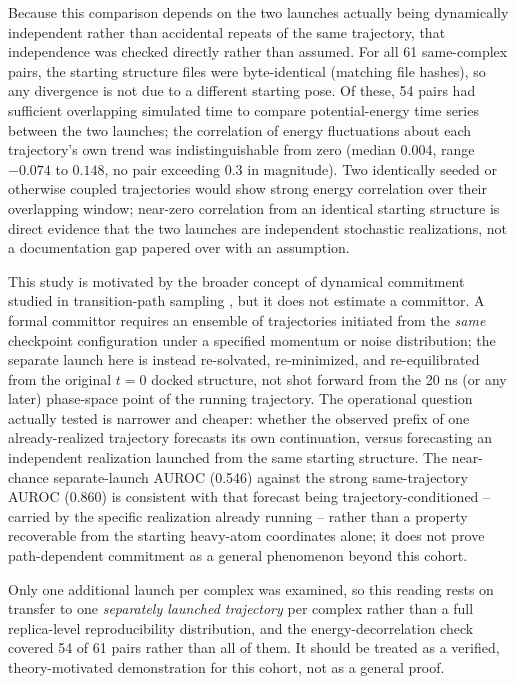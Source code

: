 \documentclass[11pt]{article}
\begin{document}
Because this comparison depends on the two launches actually being dynamically independent rather than accidental repeats of the same trajectory, that independence was checked directly rather than assumed. For all 61 same-complex pairs, the starting structure files were byte-identical (matching file hashes), so any divergence is not due to a different starting pose. Of these, 54 pairs had sufficient overlapping simulated time to compare potential-energy time series between the two launches; the correlation of energy fluctuations about each trajectory's own trend was indistinguishable from zero (median 0.004, range $-0.074$ to $0.148$, no pair exceeding 0.3 in magnitude). Two identically seeded or otherwise coupled trajectories would show strong energy correlation over their overlapping window; near-zero correlation from an identical starting structure is direct evidence that the two launches are independent stochastic realizations, not a documentation gap papered over with an assumption.

This study is motivated by the broader concept of dynamical commitment studied in transition-path sampling \cite{bolhuis2002tps,e2006towards,peters2016reaction}, but it does not estimate a committor. A formal committor requires an ensemble of trajectories initiated from the \emph{same} checkpoint configuration under a specified momentum or noise distribution; the separate launch here is instead re-solvated, re-minimized, and re-equilibrated from the original $t=0$ docked structure, not shot forward from the 20 ns (or any later) phase-space point of the running trajectory. The operational question actually tested is narrower and cheaper: whether the observed prefix of one already-realized trajectory forecasts its own continuation, versus forecasting an independent realization launched from the same starting structure. The near-chance separate-launch AUROC (0.546) against the strong same-trajectory AUROC (0.860) is consistent with that forecast being trajectory-conditioned -- carried by the specific realization already running -- rather than a property recoverable from the starting heavy-atom coordinates alone; it does not prove path-dependent commitment as a general phenomenon beyond this cohort.

Only one additional launch per complex was examined, so this reading rests on transfer to one \emph{separately launched trajectory} per complex rather than a full replica-level reproducibility distribution, and the energy-decorrelation check covered 54 of 61 pairs rather than all of them. It should be treated as a verified, theory-motivated demonstration for this cohort, not as a general proof.
\end{document}
